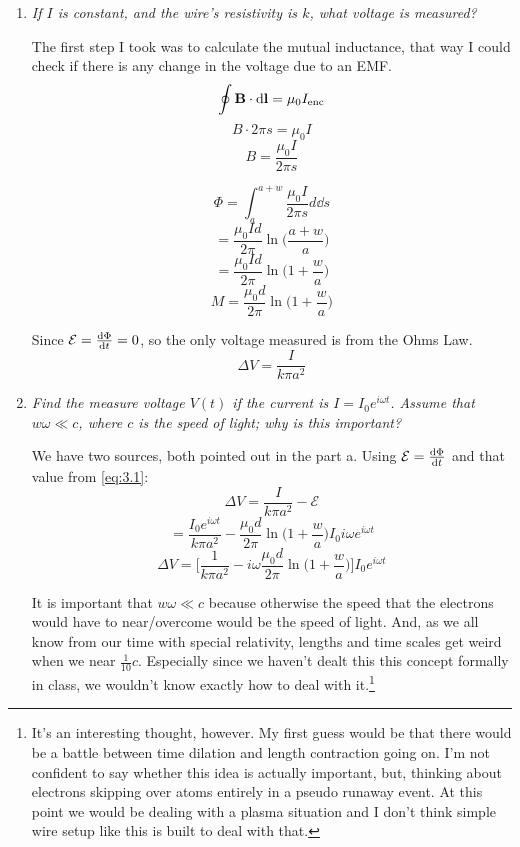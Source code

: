 \documentclass[12pt]{article}
\begin{document}
\begin{enumerate}[label=\alph*)]
\item \emph{If $I$ is constant, and the wire's resistivity is $k$, what voltage is measured?}\bigskip

The first step I took was to calculate the mutual inductance, that way I could check if there is any change in the voltage due to an EMF. 
\[\oint \vb{B}\cdot \dd{\vb{l}} = \mu_0 I_\text{enc}\]
\[B\cdot 2\pi s = \mu_0 I\]
\[B = \frac{\mu_0 I}{2 \pi s}\]\bigskip

\[\Phi = \int^{a+w}_a \frac{\mu_0 I}{2 \pi s} d \dd{s}\]
\[= \frac{\mu_0 I d}{2 \pi}\ln\Big(\frac{a+w}{a}\Big)\]
\[= \frac{\mu_0 I d}{2 \pi}\ln\Big(1+\frac{w}{a}\Big)\]\bigskip
\begin{equation}
M = \frac{\mu_0 d}{2 \pi}\ln\Big(1+\frac{w}{a}\Big)
\label{eq:3.1}
\end{equation}

Since $\mathcal{E} = \dv{\Phi}{t} = 0$, so the only voltage measured is from the Ohms Law.
\[\Delta V = \frac{I}{k \pi a^2}\]

\item \emph{Find the measure voltage $V(t)$ if the current is $I = I_0 e^{i\omega t}$. Assume that $w\omega \ll c$, where $c$ is the speed of light; why is this important?}\bigskip

We have two sources, both pointed out in the part a. Using $\mathcal{E} = \dv{\Phi}{t}$ and that value from \eqref{eq:3.1}:
\[\Delta V = \frac{I}{k \pi a^2} - \mathcal{E}\]
\[= \frac{I_0 e^{i\omega t}}{k \pi a^2}-\frac{\mu_0 d}{2 \pi} \ln\Big(1 + \frac{w}{a}\Big) I_0 i\omega e^{i \omega t} \]
\[\Delta V = \Big[\frac{1}{k \pi a^2}- i\omega \frac{\mu_0 d}{2 \pi} \ln\Big(1 + \frac{w}{a}\Big)\Big]I_0 e^{i \omega t} \]\bigskip

It is important that $w\omega \ll c$ because otherwise the speed that the electrons would have to near/overcome would be the speed of light. And, as we all know from our time with special relativity, lengths and time scales get weird when we near $\frac{1}{10} c$. Especially since we haven't dealt this this concept formally in class, we wouldn't know exactly how to deal with it.\footnote{It's an interesting thought, however. My first guess would be that there would be a battle between time dilation and length contraction going on. I'm not confident to say whether this idea is actually important, but, thinking about electrons skipping over atoms entirely in a pseudo runaway event. At this point we would be dealing with a plasma situation and I don't think simple wire setup like this is built to deal with that.} 

\end{enumerate}
\newpage
\end{document}

